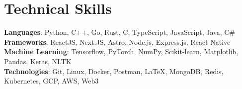     \resumeSubHeadingListEnd
\vspace{-15pt}

%
\section{Technical Skills}
 \begin{itemize}[leftmargin=0.15in,label={}]
    \small{\item{
     \textbf{Languages}{: Python, C++, Go, Rust, C, TypeScript, JavaScript, Java, C\#} \\
     \textbf{Frameworks}{: ReactJS, Next.JS, Astro, Node.js, Express.js, React Native} \\
     \textbf{Machine Learning}{: Tensorflow, PyTorch, NumPy, Scikit-learn, Matplotlib, Pandas, Keras, NLTK} \\
     \textbf{Technologies}{: Git, Linux, Docker, Postman, \LaTeX, MongoDB, Redis, Kubernetes, GCP, AWS, Web3} \\
    }}
 \end{itemize}
 \vspace{-16pt}
